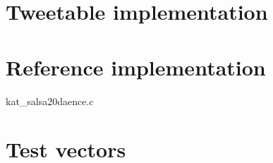 \documentclass{article}
\begin{document}
\newpage
\appendix

\section{Tweetable implementation}



\section{Reference implementation}


  {kat_salsa20daence.c}

\newpage
\section{Test vectors}


\end{document}
